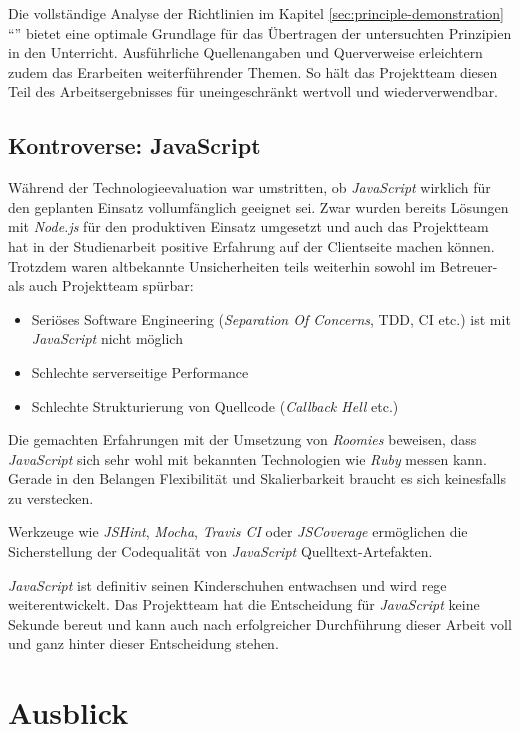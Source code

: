 Die vollständige Analyse der Richtlinien im Kapitel \ref{sec:principle-demonstration} ``'' bietet eine optimale Grundlage für das Übertragen der untersuchten Prinzipien in den Unterricht. Ausführliche Quellenangaben und Querverweise erleichtern zudem das Erarbeiten weiterführender Themen. So hält das Projektteam diesen Teil des Arbeitsergebnisses für uneingeschränkt wertvoll und wiederverwendbar.


\subsection*{Kontroverse: JavaScript}

Während der Technologieevaluation war umstritten, ob \emph{JavaScript} wirklich für den geplanten Einsatz vollumfänglich geeignet sei. Zwar wurden bereits Lösungen mit \emph{Node.js} für den produktiven Einsatz umgesetzt und auch das Projektteam hat in der Studienarbeit positive Erfahrung auf der Clientseite machen können. Trotzdem waren altbekannte Unsicherheiten teils weiterhin sowohl im Betreuer- als auch Projektteam spürbar:

\begin{itemize}
	\item Seriöses Software Engineering (\emph{Separation Of Concerns}, \gls{TDD}, CI etc.) ist mit \emph{JavaScript} nicht möglich
	\item Schlechte serverseitige Performance
	\item Schlechte Strukturierung von Quellcode (\emph{Callback Hell} etc.)
\end{itemize}

Die gemachten Erfahrungen mit der Umsetzung von \emph{Roomies} beweisen, dass \emph{JavaScript} sich sehr wohl mit bekannten Technologien wie \emph{Ruby} messen kann. Gerade in den Belangen Flexibilität und Skalierbarkeit braucht es sich keinesfalls zu verstecken.

Werkzeuge wie \emph{JSHint}, \emph{Mocha}, \emph{Travis CI} oder \emph{JSCoverage} ermöglichen die Sicherstellung der Codequalität von \emph{JavaScript} Quelltext-Artefakten.

\emph{JavaScript} ist definitiv seinen Kinderschuhen entwachsen und wird rege weiterentwickelt. Das Projektteam hat die Entscheidung für \emph{JavaScript} keine Sekunde bereut und kann auch nach erfolgreicher Durchführung dieser Arbeit voll und ganz hinter dieser Entscheidung stehen.


\section*{Ausblick}

